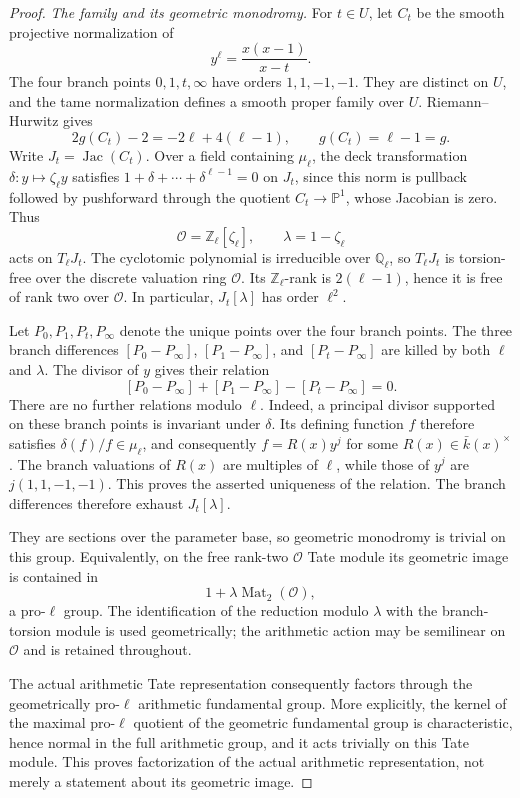 \begin{proof}
\emph{The family and its geometric monodromy.}
For $t\in U$, let $C_t$ be the smooth projective normalization of
\[
                  y^\ell=\frac{x(x-1)}{x-t}.
 \tag{E.218.3}
\]
The four branch points $0,1,t,\infty$ have orders $1,1,-1,-1$. They are
distinct on $U$, and the tame normalization defines a smooth proper family
over $U$. Riemann--Hurwitz gives
\[
 2g(C_t)-2=-2\ell+4(\ell-1),\qquad g(C_t)=\ell-1=g.
 \tag{E.218.4}
\]
Write $J_t=\operatorname{Jac}(C_t)$. Over a field containing $\mu_\ell$, the
deck transformation $\delta:y\mapsto\zeta_\ell y$ satisfies
$1+\delta+\cdots+\delta^{\ell-1}=0$ on $J_t$, since this norm is pullback
followed by pushforward through the quotient $C_t\to\mathbb P^1$, whose
Jacobian is zero. Thus
\[
 \mathcal O=\mathbb Z_\ell[\zeta_\ell],\qquad
 \lambda=1-\zeta_\ell
 \tag{E.218.5}
\]
acts on $T_\ell J_t$. The cyclotomic polynomial is irreducible over
$\mathbb Q_\ell$, so $T_\ell J_t$ is torsion-free over the discrete valuation
ring $\mathcal O$. Its $\mathbb Z_\ell$-rank is $2(\ell-1)$, hence it is free
of rank two over $\mathcal O$. In particular, $J_t[\lambda]$ has order
$\ell^2$.

Let $P_0,P_1,P_t,P_\infty$ denote the unique points over the four branch
points. The three branch differences $[P_0-P_\infty]$, $[P_1-P_\infty]$,
and $[P_t-P_\infty]$ are killed by both $\ell$ and $\lambda$. The divisor
of $y$ gives their relation
\[
 [P_0-P_\infty]+[P_1-P_\infty]-[P_t-P_\infty]=0.
 \tag{E.218.6}
\]
There are no further relations modulo $\ell$. Indeed, a principal divisor
supported on these branch points is invariant under $\delta$. Its defining
function $f$ therefore satisfies $\delta(f)/f\in\mu_\ell$, and consequently
$f=R(x)y^j$ for some $R(x)\in\bar k(x)^\times$. The branch valuations of
$R(x)$ are multiples of $\ell$, while those of $y^j$ are
$j(1,1,-1,-1)$. This proves the asserted uniqueness of the relation. The
branch differences therefore exhaust $J_t[\lambda]$.

They are sections over the parameter base, so geometric monodromy is
trivial on this group. Equivalently, on the free rank-two $\mathcal O$
Tate module its geometric image is contained in
\[
                1+\lambda\operatorname{Mat}_2(\mathcal O),
 \tag{E.218.7}
\]
a pro-$\ell$ group. The identification of the reduction modulo $\lambda$
with the branch-torsion module is used geometrically; the arithmetic
action may be semilinear on $\mathcal O$ and is retained throughout.

The actual arithmetic Tate representation consequently factors through
the geometrically pro-$\ell$ arithmetic fundamental group. More
explicitly, the kernel of the maximal pro-$\ell$ quotient of the geometric
fundamental group is characteristic, hence normal in the full arithmetic
group, and it acts trivially on this Tate module. This proves factorization
of the actual arithmetic representation, not merely a statement about its
geometric image.


\end{proof}
